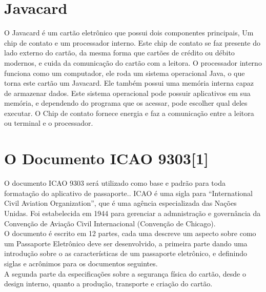 \documentclass{article}
\begin{document}
	\section{Javacard\cite{JAVACHEN}}
		\begin{flushleft}
			\begin{large}

				\hspace{2cm} O Javacard é um cartão eletrônico que possui dois componentes principais, Um chip de contato e um processador interno. Este chip de contato se faz presente do lado externo do cartão, da mesma forma que cartões de crédito ou débito modernos, e cuida da comunicação do cartão com a leitora. O processador interno funciona como um computador, ele roda um sistema operacional Java, o que torna este cartão um Javacard. Ele também possui uma memória interna capaz de armazenar dados. Este sistema operacional pode possuir aplicativos em sua memória, e dependendo do programa que os acessar, pode escolher qual deles executar. O Chip de contato fornece energia e faz a comunicação entre a leitora ou terminal e o processador.

			\end{large}
		\end{flushleft}

    
	\section{O Documento ICAO 9303[1]}
		\begin{flushleft}
			\begin{large}
				\hspace{2cm} O documento ICAO 9303 será utilizado como base e padrão para toda formatação do aplicativo de passaporte.. ICAO é uma sigla para “International Civil Aviation Organization”, que é uma agência especializada das Nações Unidas. Foi estabelecida em 1944 para gerenciar a admnistração e governância da Convenção de Aviação Civil Internacional (Convenção de Chicago). \\
    			\hspace{2cm} O documento é escrito em 12 partes, cada uma descreve um aspecto sobre como um Passaporte Eletrônico deve ser desenvolvido, a primeira parte dando uma introdução sobre o as características de um passaporte eletrônico, e definindo siglas e acrônimos para os documentos seguintes.\\
    			\hspace{2cm} A segunda parte da especificações sobre a segurança física do cartão, desde o design interno, quanto a produção, transporte e criação do cartão. 


			\end{large}
		\end{flushleft}
\end{document}
